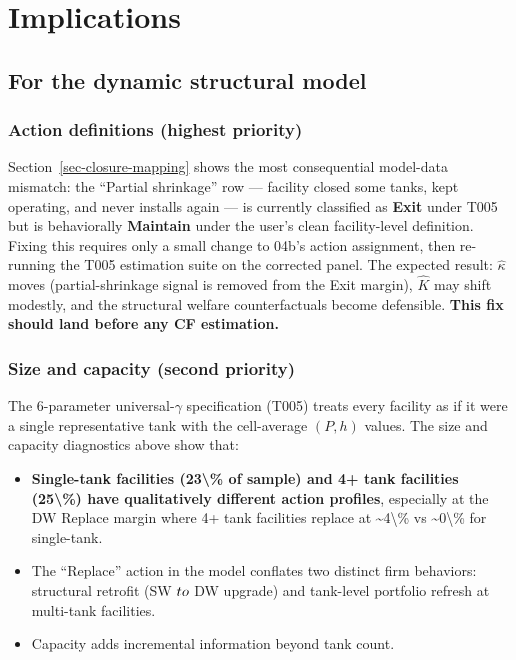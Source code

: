 \documentclass[
  11pt,
]{article}
\providecommand{\tightlist}{%
  \setlength{\itemsep}{0pt}\setlength{\parskip}{0pt}}\usepackage{longtable,booktabs,array}
\begin{document}
\section{Implications}\label{implications}

\subsection{For the dynamic structural
model}\label{for-the-dynamic-structural-model}

\subsubsection{Action definitions (highest
priority)}\label{action-definitions-highest-priority}

Section~\ref{sec-closure-mapping} shows the most consequential
model-data mismatch: the ``Partial shrinkage'' row --- facility closed
some tanks, kept operating, and never installs again --- is currently
classified as \textbf{Exit} under T005 but is behaviorally
\textbf{Maintain} under the user's clean facility-level definition.
Fixing this requires only a small change to 04b's action assignment,
then re-running the T005 estimation suite on the corrected panel. The
expected result: \(\hat\kappa\) moves (partial-shrinkage signal is
removed from the Exit margin), \(\hat K\) may shift modestly, and the
structural welfare counterfactuals become defensible. \textbf{This fix
should land before any CF estimation.}

\subsubsection{Size and capacity (second
priority)}\label{size-and-capacity-second-priority}

The 6-parameter universal-\(\gamma\) specification (T005) treats every
facility as if it were a single representative tank with the
cell-average \((P, h)\) values. The size and capacity diagnostics above
show that:

\begin{itemize}
\tightlist
\item
  \textbf{Single-tank facilities (23\textbackslash\% of sample) and 4+
  tank facilities (25\textbackslash\%) have qualitatively different
  action profiles}, especially at the DW Replace margin where 4+ tank
  facilities replace at \textasciitilde4\textbackslash\% vs
  \textasciitilde0\textbackslash\% for single-tank.
\item
  The ``Replace'' action in the model conflates two distinct firm
  behaviors: structural retrofit (SW \(\\to\) DW upgrade) and tank-level
  portfolio refresh at multi-tank facilities.
\item
  Capacity adds incremental information beyond tank count.
\end{itemize}
\end{document}
